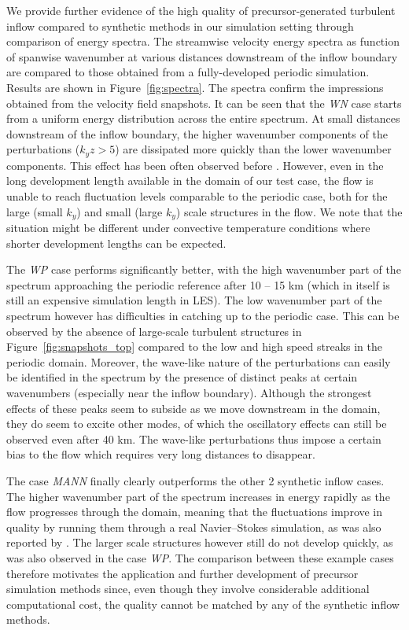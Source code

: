 	We provide further evidence of the high quality of precursor-generated turbulent inflow compared to synthetic methods in our simulation setting through  comparison of energy spectra.  The streamwise velocity energy spectra as function of spanwise wavenumber at various distances  downstream of the inflow boundary are compared to those obtained from a fully-developed periodic simulation. Results are shown in Figure~\ref{fig:spectra}. The spectra confirm the impressions obtained from the velocity field snapshots. It can be seen that the \emph{WN} case starts from a uniform energy distribution across the entire spectrum. At small distances downstream of the inflow boundary, the higher wavenumber components of the perturbations ($k_y z > 5$) are dissipated more quickly than the lower wavenumber components. This effect has been often observed before \citep{klein2003digital,keating2004priori,rana2011importance}. However, even in the long development length available in the domain of our test case, the flow is unable to reach fluctuation levels comparable to the periodic case, both for the large (small $k_y$) and small (large $k_y$) scale structures in the flow. We note that the situation might be different under convective temperature conditions where shorter development lengths can be expected.
	
	The  \emph{WP} case performs  significantly better, with the high wavenumber part of the spectrum approaching the periodic reference after 10
	-- 15 km (which in itself is still an expensive simulation length in LES). The low wavenumber part of the spectrum however has     
	difficulties in catching up to the periodic case. This can be observed by the absence of large-scale turbulent structures in Figure~\ref{fig:snapshots_top} compared to the low and high speed streaks in the periodic domain. Moreover, the wave-like nature of the perturbations can easily be identified in the spectrum by the presence of distinct peaks at certain wavenumbers (especially near the inflow boundary). Although the strongest effects of these peaks seem to subside as we move downstream in the domain, they do seem to excite other modes, of which the oscillatory effects can still be observed even after 40 km. The wave-like perturbations thus impose a certain bias to the flow which requires  very long distances to disappear.
	
	The case \emph{MANN} finally clearly outperforms the other 2 synthetic inflow cases. The higher wavenumber part of the spectrum increases in energy rapidly as the flow progresses through the domain, meaning that the fluctuations improve in quality by running them through a real Navier--Stokes simulation, as was also reported by \cite{gilling2011imposing}. The larger scale structures however still do not develop quickly, as was also observed in the case \emph{WP}. The comparison between these example cases therefore motivates the application and further development of precursor simulation methods since, even though they involve considerable additional computational cost, the quality cannot be matched by any of the synthetic inflow methods.

